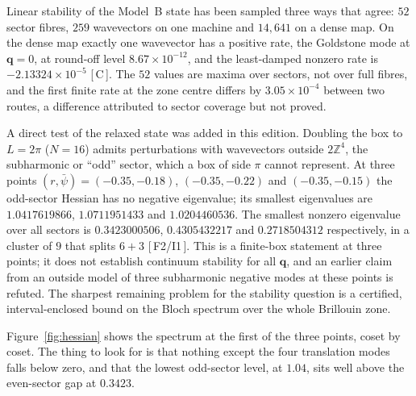 \documentclass[a4paper,11pt]{article}
\numberwithin{equation}{section}
\theoremstyle{jsplain}
\theoremstyle{jsrem}
\newcommand{\grade}[1]{[\,#1\,]}
\begin{document}
Linear stability of the Model~B state has been sampled three ways that agree: $52$ sector fibres, $259$ wavevectors on one machine and $14{,}641$ on a dense map. On the dense map exactly one wavevector has a positive rate, the Goldstone mode at $\mathbf{q}=0$, at round-off level $8.67\times10^{-12}$, and the least-damped nonzero rate is $-2.13324\times10^{-5}$ \grade{C}. The $52$ values are maxima over sectors, not over full fibres, and the first finite rate at the zone centre differs by $3.05\times10^{-4}$ between two routes, a difference attributed to sector coverage but not proved.

A direct test of the relaxed state was added in this edition. Doubling the box to $L=2\pi$ ($N=16$) admits perturbations with wavevectors outside $2\mathbb{Z}^4$, the subharmonic or ``odd'' sector, which a box of side $\pi$ cannot represent. At three points $(r,\bar\psi)=(-0.35,-0.18)$, $(-0.35,-0.22)$ and $(-0.35,-0.15)$ the odd-sector Hessian has no negative eigenvalue; its smallest eigenvalues are $1.0417619866$, $1.0711951433$ and $1.0204460536$. The smallest nonzero eigenvalue over all sectors is $0.3423000506$, $0.4305432217$ and $0.2718504312$ respectively, in a cluster of $9$ that splits $6+3$ \grade{F2/I1}. This is a finite-box statement at three points; it does not establish continuum stability for all $\mathbf{q}$, and an earlier claim from an outside model of three subharmonic negative modes at these points is refuted. The sharpest remaining problem for the stability question is a certified, interval-enclosed bound on the Bloch spectrum over the whole Brillouin zone.

Figure~\ref{fig:hessian} shows the spectrum at the first of the three points, coset by coset. The thing to look for is that nothing except the four translation modes falls below zero, and that the lowest odd-sector level, at $1.04$, sits well above the even-sector gap at $0.3423$.
\end{document}
